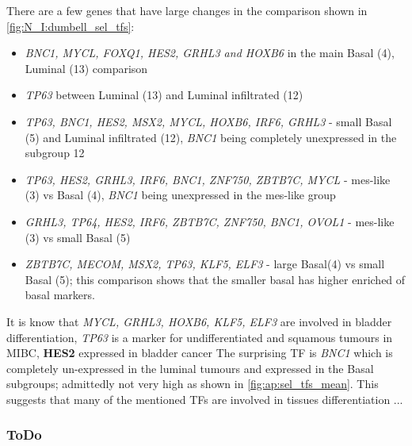 There are a few genes that have large changes in the comparison shown in \cref{fig:N_I:dumbell_sel_tfs}: 
\begin{itemize}
    \item \textit{BNC1, MYCL, FOXQ1, HES2, GRHL3 and HOXB6} in the main Basal (4), Luminal (13) comparison
    \item \textit{TP63} between Luminal (13) and Luminal infiltrated (12)
    \item \textit{TP63, BNC1, HES2, MSX2, MYCL, HOXB6, IRF6, GRHL3} - small Basal (5) and Luminal infiltrated (12), \textit{BNC1} being completely unexpressed in the subgroup 12
    \item \textit{TP63, HES2, GRHL3, IRF6, BNC1, ZNF750, ZBTB7C, MYCL} - mes-like (3) vs Basal (4), \textit{BNC1} being unexpressed in the mes-like group
    \item \textit{GRHL3, TP64, HES2, IRF6, ZBTB7C, ZNF750, BNC1, OVOL1} - mes-like (3) vs small Basal (5) 
    \item \textit{ZBTB7C, MECOM, MSX2, TP63, KLF5, ELF3} - large Basal(4) vs small Basal (5); this comparison shows that the smaller basal has higher enriched of basal markers.
\end{itemize}

It is know that \textit{MYCL, GRHL3, HOXB6, KLF5, ELF3} are involved in bladder differentiation, \textit{TP63} is a marker for undifferentiated and squamous tumours in MIBC, \textbf{HES2} expressed in bladder cancer The surprising TF is \textit{BNC1} which is completely un-expressed in the luminal tumours and expressed in the Basal subgroups; admittedly not very high as shown in \cref{fig:ap:sel_tfs_mean}. This suggests that many of the mentioned TFs are involved in tissues differentiation ...





\newpage

\subsubsection{ToDo}

